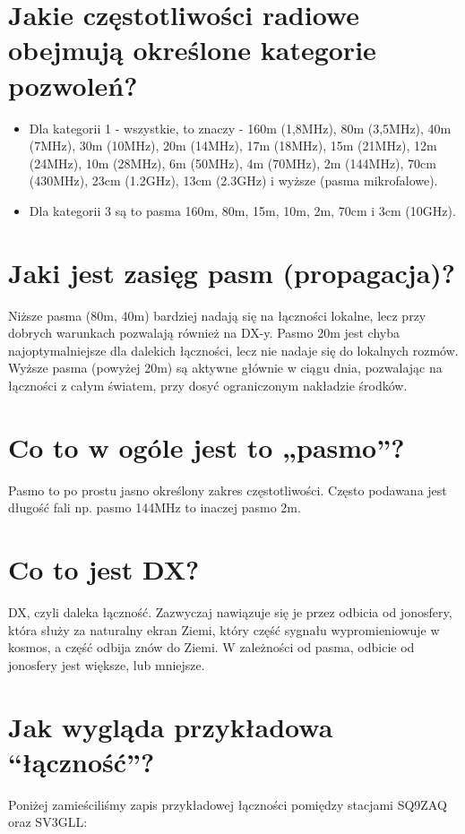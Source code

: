 \documentclass[a4paper,12pt]{article}
\begin{document}
\section{Jakie częstotliwości radiowe obejmują określone kategorie pozwoleń?}
\begin{itemize}
\item Dla kategorii 1 - wszystkie, to znaczy - 160m (1,8MHz), 80m (3,5MHz), 40m (7MHz), 30m (10MHz), 20m (14MHz), 17m (18MHz), 15m (21MHz), 12m (24MHz), 10m (28MHz), 6m (50MHz), 4m (70MHz), 2m (144MHz), 70cm (430MHz), 23cm (1.2GHz), 13cm (2.3GHz) i wyższe (pasma mikrofalowe). 
\item Dla kategorii 3 są to pasma 160m, 80m, 15m, 10m, 2m, 70cm i 3cm (10GHz).\end{itemize}

\section{Jaki jest zasięg pasm (propagacja)?}
Niższe pasma (80m, 40m) bardziej nadają się na łączności lokalne, lecz przy dobrych warunkach pozwalają również na DX-y. Pasmo 20m jest chyba najoptymalniejsze dla dalekich łączności, lecz nie nadaje się do lokalnych rozmów. Wyższe pasma (powyżej 20m) są aktywne głównie w ciągu dnia, pozwalając na łączności z całym światem, przy dosyć ograniczonym nakładzie środków.

\section{Co to w ogóle jest to „pasmo”?}
Pasmo to po prostu jasno określony zakres częstotliwości. Często podawana jest długość fali np. pasmo 144MHz to inaczej pasmo 2m.

\section{Co to jest DX?}
DX, czyli daleka łączność. Zazwyczaj nawiązuje się je przez odbicia od jonosfery, która służy za naturalny ekran Ziemi, który część sygnału wypromieniowuje w kosmos, a część odbija znów do Ziemi. W zależności od pasma, odbicie od jonosfery jest większe, lub mniejsze.

\section{Jak wygląda przykładowa ``łączność''?}
Poniżej zamieściliśmy zapis przykładowej łączności pomiędzy stacjami SQ9ZAQ oraz SV3GLL:
\end{document}
